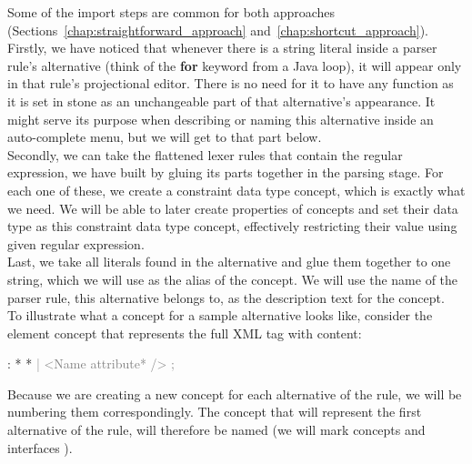 Some of the import steps are common for both approaches (Sections~\ref{chap:straightforward_approach} and~\ref{chap:shortcut_approach}).
\\

Firstly, we have noticed that whenever there is a string literal inside a parser rule's alternative (think of the \textbf{for} keyword from a Java loop), it will appear only in that rule's projectional editor.
There is no need for it to have any function as it is set in stone as an unchangeable part of that alternative's appearance.
It might serve its purpose when describing or naming this alternative inside an auto-complete menu, but we will get to that part below.
\\

Secondly, we can take the flattened lexer rules that contain the regular expression, we have built by gluing its parts together in the parsing stage.
For each one of these, we create a constraint data type concept, which is exactly what we need.
We will be able to later create properties of concepts and set their data type as this constraint data type concept, effectively restricting their value using given regular expression.
\\

Last, we take all literals found in the alternative and glue them together to one string, which we will use as the alias of the concept.
We will use the name of the parser rule, this alternative belongs to, as the description text for the concept.
\\

To illustrate what a concept for a sample alternative looks like, consider the element concept that represents the full XML tag with content:

\begin{antlr}
	      :   \literal{<}  * \literal{>} * \literal{</}  \literal{>}
             \textcolor{gray}{|   \ap<\ap Name attribute* \ap/>\ap}
             \textcolor{gray}{;}
\end{antlr}

Because we are creating a new concept for each alternative of the rule, we will be numbering them correspondingly.
The concept that will represent the first alternative of the  rule, will therefore be named 
(we will mark concepts  and interfaces ).


